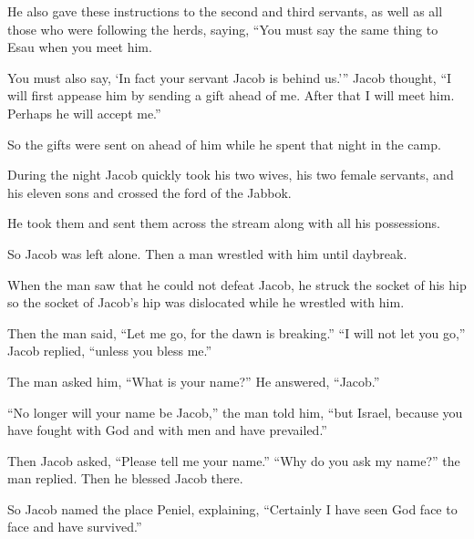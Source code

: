 \begin{scripture}
 He also gave these instructions to the second and third servants, as well as all those who were following the herds, saying, ``You must say the same thing to Esau when you meet him.
 You must also say, `In fact your servant Jacob is behind us.''' Jacob thought, ``I will first appease him by sending a gift ahead of me. After that I will meet him. Perhaps he will accept me.''
 So the gifts were sent on ahead of him while he spent that night in the camp.
\everypar{}

 During the night Jacob quickly took his two wives, his two female servants, and his eleven sons and crossed the ford of the Jabbok.
 He took them and sent them across the stream along with all his possessions.
 So Jacob was left alone. Then a man wrestled with him until daybreak.
 When the man saw that he could not defeat Jacob, he struck the socket of his hip so the socket of Jacob's hip was dislocated while he wrestled with him.
\everypar{}

 Then the man said, ``Let me go, for the dawn is breaking.'' ``I will not let you go,'' Jacob replied, ``unless you bless me.''
 The man asked him, ``What is your name?'' He answered, ``Jacob.''
 ``No longer will your name be Jacob,'' the man told him, ``but Israel, because you have fought with God and with men and have prevailed.''
\everypar{}

 Then Jacob asked, ``Please tell me your name.'' ``Why do you ask my name?'' the man replied. Then he blessed Jacob there.
 So Jacob named the place Peniel, explaining, ``Certainly I have seen God face to face and have survived.''
\everypar{}


\end{scripture}

